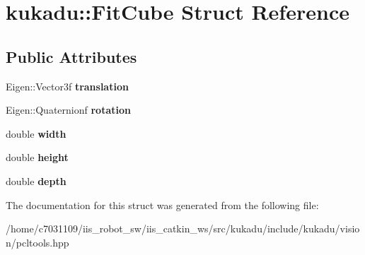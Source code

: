 \hypertarget{structkukadu_1_1FitCube}{\section{kukadu\-:\-:Fit\-Cube Struct Reference}
\label{structkukadu_1_1FitCube}
}
\subsection*{Public Attributes}
\begin{DoxyCompactItemize}
\item 
\hypertarget{structkukadu_1_1FitCube_a3c6db4d46c8590ff97dbbff598582a97}{Eigen\-::\-Vector3f {\bfseries translation}}\label{structkukadu_1_1FitCube_a3c6db4d46c8590ff97dbbff598582a97}

\item 
\hypertarget{structkukadu_1_1FitCube_a29b6a3208ee456ff1be675f437207181}{Eigen\-::\-Quaternionf {\bfseries rotation}}\label{structkukadu_1_1FitCube_a29b6a3208ee456ff1be675f437207181}

\item 
\hypertarget{structkukadu_1_1FitCube_a043b12b7b4ba7816f111bfd78c042c67}{double {\bfseries width}}\label{structkukadu_1_1FitCube_a043b12b7b4ba7816f111bfd78c042c67}

\item 
\hypertarget{structkukadu_1_1FitCube_a3980860da490da901f8358d26d70aa80}{double {\bfseries height}}\label{structkukadu_1_1FitCube_a3980860da490da901f8358d26d70aa80}

\item 
\hypertarget{structkukadu_1_1FitCube_a82c207a4ab142db5de51545a46be6e57}{double {\bfseries depth}}\label{structkukadu_1_1FitCube_a82c207a4ab142db5de51545a46be6e57}

\end{DoxyCompactItemize}


The documentation for this struct was generated from the following file\-:\begin{DoxyCompactItemize}
\item 
/home/c7031109/iis\-\_\-robot\-\_\-sw/iis\-\_\-catkin\-\_\-ws/src/kukadu/include/kukadu/vision/pcltools.\-hpp\end{DoxyCompactItemize}
